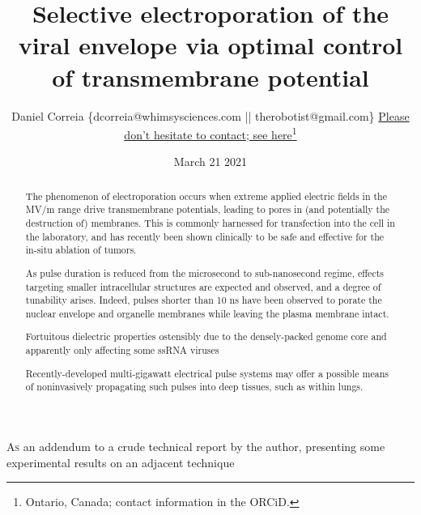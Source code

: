 \documentclass[fleqn,10pt]{paper}
\begin{document}
\title{Selective electroporation of the viral envelope via optimal control of transmembrane potential}
\author{\footnotesize{Daniel Correia \{dcorreia@whimsysciences.com || therobotist@gmail.com\}
		 \href{https://0xdbfb7.com/email_pledge.txt}{Please don't hesitate to contact; see here}}\footnote{Ontario, Canada; contact information in the ORCiD.}}
\date{\small{March 21 2021}}

\flushbottom 
\maketitle



\thispagestyle{empty}

\renewcommand{\abstractname}{Summary}    %

\begin{abstract}
	\noindent The phenomenon of electroporation occurs when extreme applied electric fields in the MV/m range drive transmembrane potentials, leading to pores in (and potentially the destruction of) membranes. This is commonly harnessed for transfection into the cell in the laboratory, and has recently been shown clinically to be safe and effective for the in-situ ablation of tumors.
	
	\noindent As pulse duration is reduced from the microsecond to sub-nanosecond regime, effects targeting smaller intracellular structures are expected and observed, and a degree of tunability arises. Indeed, pulses shorter than 10 ns have been observed to porate the nuclear envelope and organelle membranes while leaving the plasma membrane intact.
	
	Fortuitous dielectric properties ostensibly due to the densely-packed genome core and apparently only affecting some ssRNA viruses 
	
	\noindent Recently-developed multi-gigawatt electrical pulse systems may offer a possible means of noninvasively propagating such pulses into deep tissues, such as within lungs. 
\end{abstract}




\lettrine{A}{s} an addendum to a crude technical report \cite{notes2021} by the author, presenting some experimental results on an adjacent technique
\end{document}
